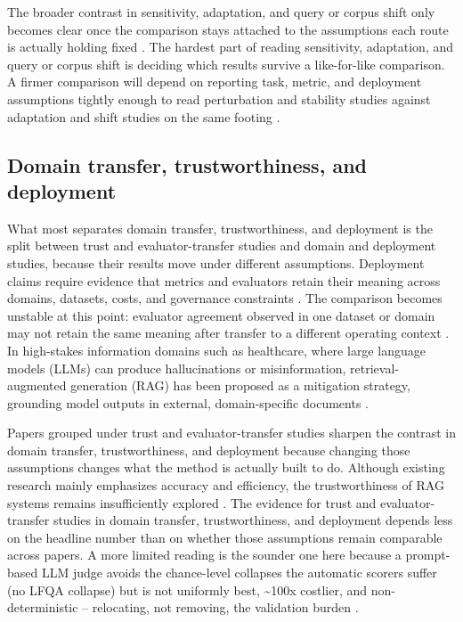 \documentclass[a4paper,11pt]{article}
\begin{document}
The broader contrast in sensitivity, adaptation, and query or corpus shift only becomes clear once the comparison stays attached to the assumptions each route is actually holding fixed \citep{Sun2026Robust,Muthyam2026Systems,Li2026Mrag}. The hardest part of reading sensitivity, adaptation, and query or corpus shift is deciding which results survive a like-for-like comparison. A firmer comparison will depend on reporting task, metric, and deployment assumptions tightly enough to read perturbation and stability studies against adaptation and shift studies on the same footing \citep{Muthyam2026Systems,Sun2026Robust}.
\subsection{Domain transfer, trustworthiness, and deployment}


What most separates domain transfer, trustworthiness, and deployment is the split between trust and evaluator-transfer studies and domain and deployment studies, because their results move under different assumptions. Deployment claims require evidence that metrics and evaluators retain their meaning across domains, datasets, costs, and governance constraints \citep{Ding2026Attribution,Zhou2024Trustworthiness,Cahoon2025Optimizing,Kovalskii2026Domain}. The comparison becomes unstable at this point: evaluator agreement observed in one dataset or domain may not retain the same meaning after transfer to a different operating context \citep{Ding2026Attribution,Zhou2024Trustworthiness,Cahoon2025Optimizing,Kovalskii2026Domain}. In high-stakes information domains such as healthcare, where large language models (LLMs) can produce hallucinations or misinformation, retrieval-augmented generation (RAG) has been proposed as a mitigation strategy, grounding model outputs in external, domain-specific documents \citep{Javadi2025Contradictions}.

Papers grouped under trust and evaluator-transfer studies sharpen the contrast in domain transfer, trustworthiness, and deployment because changing those assumptions changes what the method is actually built to do. Although existing research mainly emphasizes accuracy and efficiency, the trustworthiness of RAG systems remains insufficiently explored \citep{Zhou2024Trustworthiness}. The evidence for trust and evaluator-transfer studies in domain transfer, trustworthiness, and deployment depends less on the headline number than on whether those assumptions remain comparable across papers. A more limited reading is the sounder one here because a prompt-based LLM judge avoids the chance-level collapses the automatic scorers suffer (no LFQA collapse) but is not uniformly best, \textasciitilde{}100x costlier, and non-deterministic -- relocating, not removing, the validation burden \citep{Ding2026Attribution}.
\end{document}
